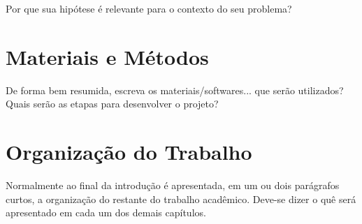 Por que sua hipótese é relevante para o contexto do seu problema?

\section{Materiais e Métodos}

De forma bem resumida, escreva os materiais/softwares... que serão utilizados? Quais serão as etapas para desenvolver o projeto?

\section{Organização do Trabalho}
\label{sec:organizacaoTrabalho}

Normalmente ao final da introdução é apresentada, em um ou dois parágrafos curtos, a organização do restante do trabalho acadêmico.
Deve-se dizer o quê será apresentado em cada um dos demais capítulos.